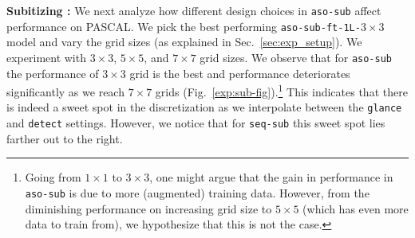 \documentclass[10pt,twocolumn,letterpaper]{article}
\newcommand{\detect}{\texttt{detect}\xspace}
\newcommand{\sub}{\texttt{aso-sub}\xspace}
\newcommand{\seq}{\texttt{seq-sub}\xspace}
\newcommand{\glance}{\texttt{glance}\xspace}
\newcommand{\pascal}{PASCAL\xspace}
\newcommand{\refsec}[1]{Sec.~\ref{#1}}
\begin{document}
\par \noindent
\textbf{Subitizing : }We next analyze how different design choices in \sub{} affect performance on \pascal. We pick the best performing \sub{}\texttt{-ft-1L-$3\times3$} model and vary the grid sizes (as explained in \refsec{sec:exp_setup}). We experiment with $3\times3$, $5\times5$, and $7\times7$ grid sizes. We observe that for \sub the performance of $3\times3$ grid is the best and performance deteriorates significantly as we reach $7\times7$ grids (Fig.~\ref{exp:sub-fig}).\footnote{Going from $1\times1$ to $3\times3$, one might argue that the gain in performance in \sub is due to more (augmented) training data. However, from the diminishing performance on increasing grid size to $5\times5$ (which has even more data to train from), we hypothesize that this is not the case.} This indicates that there is indeed a sweet spot in the discretization as we interpolate between the \glance{} and \detect{} settings. However, we notice that for \seq this sweet spot lies farther out to the right.
\end{document}
